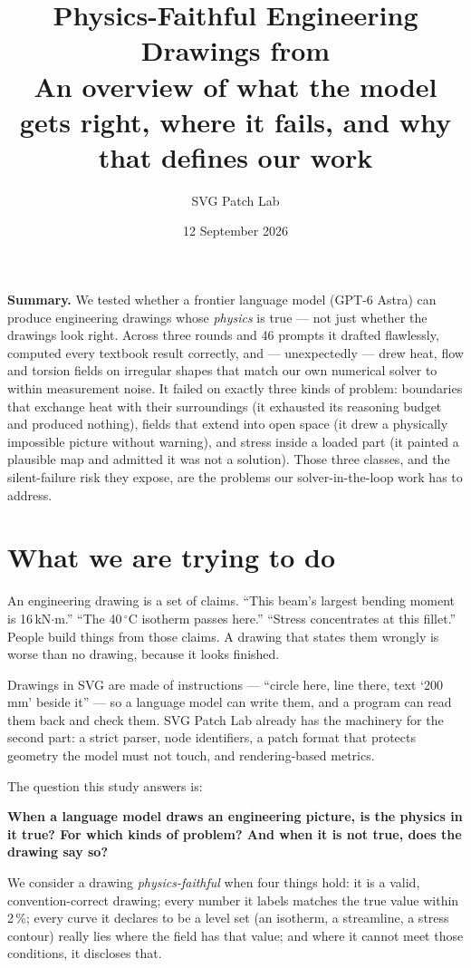 \documentclass[11pt,a4paper]{article}
\title{\LARGE Physics-Faithful Engineering Drawings from \astra\\[4pt]\large An overview of what the model gets right, where it fails, and why that defines our work}
\author{SVG Patch Lab}
\date{12 September 2026}
\newcommand{\astra}{GPT-6 Astra}
\begin{document}
\maketitle

\begin{notebox}
\textbf{Summary.} We tested whether a frontier language model (\astra) can produce engineering drawings whose \emph{physics} is true --- not just whether the drawings look right. Across three rounds and 46 prompts it drafted flawlessly, computed every textbook result correctly, and --- unexpectedly --- drew heat, flow and torsion fields on irregular shapes that match our own numerical solver to within measurement noise. It failed on exactly three kinds of problem: boundaries that exchange heat with their surroundings (it exhausted its reasoning budget and produced nothing), fields that extend into open space (it drew a physically impossible picture without warning), and stress inside a loaded part (it painted a plausible map and admitted it was not a solution). Those three classes, and the silent-failure risk they expose, are the problems our solver-in-the-loop work has to address.
\end{notebox}

\section{What we are trying to do}
An engineering drawing is a set of claims. ``This beam's largest bending moment is 16\,kN$\cdot$m.'' ``The 40\,$^{\circ}$C isotherm passes here.'' ``Stress concentrates at this fillet.'' People build things from those claims. A drawing that states them wrongly is worse than no drawing, because it looks finished.

Drawings in SVG are made of instructions --- ``circle here, line there, text `200 mm' beside it'' --- so a language model can write them, and a program can read them back and check them. SVG Patch Lab already has the machinery for the second part: a strict parser, node identifiers, a patch format that protects geometry the model must not touch, and rendering-based metrics.

The question this study answers is:
\begin{notebox}
\textbf{When a language model draws an engineering picture, is the physics in it true? For which kinds of problem? And when it is not true, does the drawing say so?}
\end{notebox}
We consider a drawing \emph{physics-faithful} when four things hold: it is a valid, convention-correct drawing; every number it labels matches the true value within 2\,\%; every curve it declares to be a level set (an isotherm, a streamline, a stress contour) really lies where the field has that value; and where it cannot meet those conditions, it discloses that.
\end{document}
